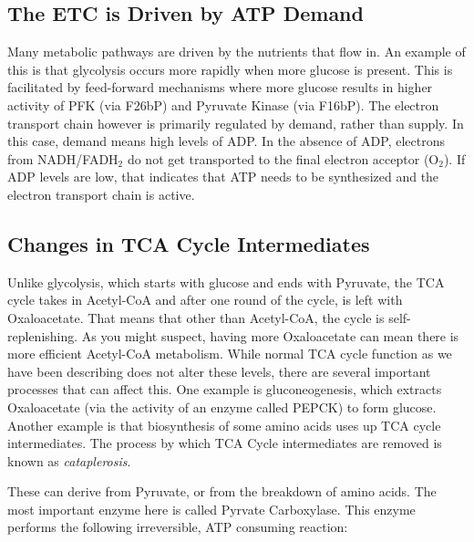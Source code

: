 \documentclass{tufte-handout}
\begin{document}
\subsection{The ETC is Driven by ATP Demand}

Many metabolic pathways are driven by the nutrients that flow in.  An example of this is that glycolysis occurs more rapidly when more glucose is present.  This is facilitated by feed-forward mechanisms where more glucose results in higher activity of PFK (via F26bP) and Pyruvate Kinase (via F16bP).  The electron transport chain however is primarily regulated by demand, rather than supply.  In this case, demand means high levels of ADP.  In the absence of ADP, electrons from NADH/FADH$_2$ do not get transported to the final electron acceptor (O$_2$).  If ADP levels are low, that indicates that ATP needs to be synthesized and the electron transport chain is active.  

\subsection{Changes in TCA Cycle Intermediates}

  Unlike glycolysis, which starts with glucose and ends with Pyruvate, the TCA cycle takes in Acetyl-CoA and after one round of the cycle, is left with Oxaloacetate.  That means that other than Acetyl-CoA, the cycle is self-replenishing.  As you might suspect, having more Oxaloacetate can mean there is more efficient Acetyl-CoA metabolism.  While normal TCA cycle function as we have been describing does not alter these levels, there are several important processes that can affect this.  One example is gluconeogenesis, which extracts Oxaloacetate (via the activity of an enzyme called PEPCK) to form glucose.  Another example is that biosynthesis of some amino acids uses up TCA cycle intermediates.  The process by which TCA Cycle intermediates are removed is known as \emph{cataplerosis}.

  These can derive from Pyruvate, or from the breakdown of amino acids.  The most important enzyme here is called Pyrvate Carboxylase.  This enzyme performs the following irreversible, ATP consuming reaction:
\end{document}
